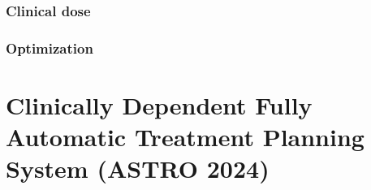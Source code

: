 \subsubsection*{Clinical dose}


\subsubsection*{Optimization}






\section{Clinically Dependent Fully Automatic Treatment Planning System (ASTRO 2024)}
